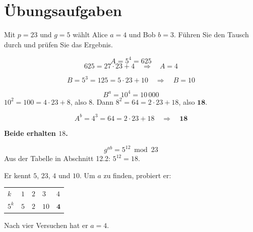 \section{Übungsaufgaben}

\begin{aufgabe}
Mit $p = 23$ und $g = 5$ wählt Alice $a = 4$ und Bob $b = 3$. Führen Sie den Tausch durch und prüfen Sie das Ergebnis.

\loesung
{}
\[ A = 5^{4} = 625 \]
\[ 625 = 27\cdot23 + 4 \quad\Longrightarrow\quad A = 4 \]

\[ B = 5^{3} = 125 = 5\cdot23+10 \quad\Longrightarrow\quad B = 10 \]

\[ B^{a} = 10^{4} = 10\,000 \]
 $10^2 = 100 = 4\cdot23+8$, also $8$. Dann $8^2 = 64 = 2\cdot23+18$, also $\mathbf{18}$.

\[ A^{b} = 4^{3} = 64 = 2\cdot23+18 \quad\Longrightarrow\quad \mathbf{18} \]

\begin{center}
\begin{minipage}{0.9\textwidth}
\textbf{Beide erhalten $18$.} \checkmark
\end{minipage}
\end{center}

\[ g^{ab} = 5^{12} \bmod 23 \]
Aus der Tabelle in Abschnitt 12.2: $5^{12} = 18$. \checkmark

Er kennt $5$, $23$, $4$ und $10$. Um $a$ zu finden, probiert er:
\begin{center}
\renewcommand{\arraystretch}{1.44}
\begin{tabular}{@{}P{1.2cm}P{1.2cm}P{1.2cm}P{1.2cm}P{1.2cm}@{}}
\toprule
$k$ & $1$ & $2$ & $3$ & $4$\\
$5^k$ & $5$ & $2$ & $10$ & $\mathbf{4}$\\
\bottomrule
\end{tabular}
\end{center}

Nach vier Versuchen hat er $a=4$.

\begin{center}
\begin{minipage}{0.88\textwidth}
\end{minipage}
\end{center}
\end{aufgabe}

